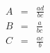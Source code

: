 \begin{eqnarray*}
  A &=& \frac{ad}{bc} \\
  B &=& \frac{a}{bc} \\
  C &=& \frac{ac}{b}
\end{eqnarray*}
